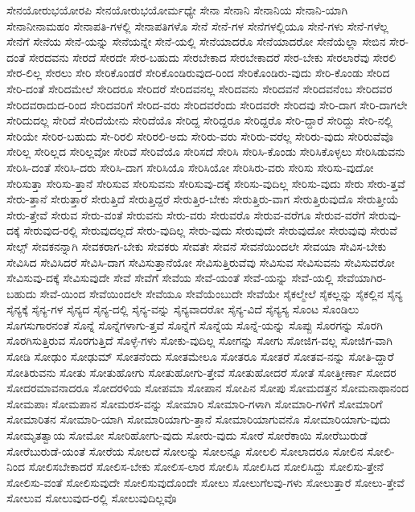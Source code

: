 {ಸೇನಯೋರುಭಯೋರಪಿ
ಸೇನಯೋರುಭಯೋರ್ಮಧ್ಯೇ
ಸೇನಾ
ಸೇನಾನಿ
ಸೇನಾನಿಯ
ಸೇನಾನಿ-ಯಾಗಿ
ಸೇನಾನೀನಾಮಹಂ
ಸೇನಾಪತಿ-ಗಳಲ್ಲಿ
ಸೇನಾಪತಿಗಳೊ
ಸೇನೆ
ಸೇನೆ-ಗಳ
ಸೇನೆಗಳಲ್ಲಿಯೂ
ಸೇನೆ-ಗಳು
ಸೇನೆ-ಗಳೆಲ್ಲ
ಸೇನೆಗೆ
ಸೇನೆಯ
ಸೇನೆ-ಯನ್ನು
ಸೇನೆಯನ್ನೇ
ಸೇನೆ-ಯಲ್ಲಿ
ಸೇನೆಯಾದರೊ
ಸೇನೆಯಾದರೋ
ಸೇನೆಯೆಲ್ಲಾ
ಸೇಬಿನ
ಸೇರ-ದಂತೆ
ಸೇರದವನು
ಸೇರದೆ
ಸೇರದೇ
ಸೇರ-ಬಹುದು
ಸೇರಬೇಕಾದ
ಸೇರಬೇಕಾದರೆ
ಸೇರ-ಬೇಕು
ಸೇರಲಾರೆವು
ಸೇರಲಿ
ಸೇರ-ಲಿಲ್ಲ
ಸೇರಲು
ಸೇರಿ
ಸೇರಿಕೊಂಡರೆ
ಸೇರಿಕೊಂಡಿರುವುದ-ರಿಂದ
ಸೇರಿಕೊಂಡಿರು-ವುದು
ಸೇರಿ-ಕೊಂಡು
ಸೇರಿದ
ಸೇರಿ-ದಂತೆ
ಸೇರಿದಮೇಲೆ
ಸೇರಿದರೂ
ಸೇರಿದರೆ
ಸೇರಿದವನಲ್ಲ
ಸೇರಿದವನು
ಸೇರಿದವನೆ
ಸೇರಿದವನೆಂಬ
ಸೇರಿದವರ
ಸೇರಿದವರಾದುದ-ರಿಂದ
ಸೇರಿದವರಿಗೆ
ಸೇರಿದ-ವರು
ಸೇರಿದವರೆಂದು
ಸೇರಿದವರೇ
ಸೇರಿದವು
ಸೇರಿ-ದಾಗ
ಸೇರಿ-ದಾಗಲೇ
ಸೇರಿದುದಲ್ಲ
ಸೇರಿದೆ
ಸೇರಿದೆಯೇನು
ಸೇರಿದೆಯೊ
ಸೇರಿದ್ದ
ಸೇರಿದ್ದರೂ
ಸೇರಿದ್ದರೊ
ಸೇರಿ-ದ್ದಾರೆ
ಸೇರಿದ್ದು
ಸೇರಿ-ನಲ್ಲಿ
ಸೇರಿಯೇ
ಸೇರಿರ-ಬಹುದು
ಸೇ-ರಿರಲಿ
ಸೇರಿರಲಿ-ಅದು
ಸೇರಿರು-ವರು
ಸೇರಿರು-ವರೆಲ್ಲ
ಸೇರಿರು-ವುದು
ಸೇರಿರುವೆವೊ
ಸೇರಿಲ್ಲ
ಸೇರಿಲ್ಲದ
ಸೇರಿಲ್ಲವೋ
ಸೇರಿವೆ
ಸೇರಿವೆಯೊ
ಸೇರಿಸದೆ
ಸೇರಿಸಿ
ಸೇರಿಸಿ-ಕೊಂಡು
ಸೇರಿಸಿಕೊಳ್ಳಲು
ಸೇರಿಸಿಡುವನು
ಸೇರಿಸಿ-ದಂತೆ
ಸೇರಿಸಿ-ದರು
ಸೇರಿಸಿ-ದಾಗ
ಸೇರಿಸಿಯೊ
ಸೇರಿಸಿಯೋ
ಸೇರಿಸಿರು-ವರು
ಸೇರಿಸು
ಸೇರಿಸು-ವುದೋ
ಸೇರಿಸುತ್ತಾ
ಸೇರಿಸು-ತ್ತಾನೆ
ಸೇರಿಸುವ
ಸೇರಿಸುವನು
ಸೇರಿಸುವು-ದಕ್ಕೆ
ಸೇರಿಸು-ವುದಿಲ್ಲ
ಸೇರಿಸು-ವುದು
ಸೇರು
ಸೇರು-ತ್ತವೆ
ಸೇರು-ತ್ತಾನೆ
ಸೇರುತ್ತಾರೆ
ಸೇರುತ್ತಿದೆ
ಸೇರುತ್ತಿದ್ದರೆ
ಸೇರುತ್ತಿರ-ಬೇಕು
ಸೇರುತ್ತಿರು-ವಾಗ
ಸೇರುತ್ತಿರುವುದೊ
ಸೇರುತ್ತೀಯೆ
ಸೇರು-ತ್ತೇವೆ
ಸೇರುವ
ಸೇರು-ವಂತೆ
ಸೇರುವನು
ಸೇರು-ವರು
ಸೇರುವರೊ
ಸೇರುವ-ವರೆಗೂ
ಸೇರುವ-ವರೆಗೆ
ಸೇರುವು-ದಕ್ಕೆ
ಸೇರುವುದ-ರಲ್ಲಿ
ಸೇರುವುದಲ್ಲದೆ
ಸೇರು-ವುದಿಲ್ಲ
ಸೇರು-ವುದು
ಸೇರುವುದೇ
ಸೇರುವುದೋ
ಸೇರುವುವು
ಸೇರುವೆ
ಸೇಲ್ಸ್
ಸೇವಕನನ್ನಾಗಿ
ಸೇವಕರಾಗ-ಬೇಕು
ಸೇವಕರು
ಸೇವತೇ
ಸೇವನೆ
ಸೇವನೆಯಿಂದಲೇ
ಸೇವಯಾ
ಸೇವಿಸ-ಬೇಕು
ಸೇವಿಸಿದ
ಸೇವಿಸಿದರೆ
ಸೇವಿಸಿ-ದಾಗ
ಸೇವಿಸುತ್ತಾನೆಯೋ
ಸೇವಿಸುತ್ತಿರುವೆವು
ಸೇವಿಸುವ
ಸೇವಿಸುವನು
ಸೇವಿಸುವರೋ
ಸೇವಿಸುವು-ದಕ್ಕೆ
ಸೇವಿಸುವುದೇ
ಸೇವೆ
ಸೇವೆಗೆ
ಸೇವೆಯ
ಸೇವೆ-ಯಂತೆ
ಸೇವೆ-ಯನ್ನು
ಸೇವೆ-ಯಲ್ಲಿ
ಸೇವೆಯಾಗಿರ-ಬಹುದು
ಸೇವೆ-ಯಿಂದ
ಸೇವೆಯಿಂದಲೇ
ಸೇವೆಯೂ
ಸೇವೆಯೆಂಬುದೇ
ಸೇವೆಯೇ
ಸೈಕಲ್ಮೇಲೆ
ಸೈಕಲ್ಲನ್ನು
ಸೈಕಲ್ಲಿನ
ಸೈನ್ಯ
ಸೈನ್ಯಕ್ಕೆ
ಸೈನ್ಯ-ಗಳ
ಸೈನ್ಯದ
ಸೈನ್ಯ-ದಲ್ಲಿ
ಸೈನ್ಯ-ವನ್ನು
ಸೈನ್ಯವಾದರೋ
ಸೈನ್ಯ-ವಿದೆ
ಸೈನ್ಯಸ್ಯ
ಸೊಂಟ
ಸೊಂಡಿಲು
ಸೊಗಸುಗಾರನಂತೆ
ಸೊನ್ನೆ
ಸೊನ್ನೆಗಳಾಗು-ತ್ತವೆ
ಸೊನ್ನೆಗೆ
ಸೊನ್ನೆಯ
ಸೊನ್ನೆ-ಯನ್ನು
ಸೊಪ್ಪು
ಸೊರಗನ್ನು
ಸೊರಗಿ
ಸೊರಗಿಸುತ್ತಿರುವ
ಸೊರಗುತ್ತಿದೆ
ಸೊಳ್ಳೆ-ಗಳು
ಸೋಕು-ವುದಿಲ್ಲ
ಸೋಗನ್ನು
ಸೋಗು
ಸೋಜಿಗ-ವಲ್ಲ
ಸೋಜಿಗ-ವಾಗಿ
ಸೋಡಿ
ಸೋಢುಂ
ಸೋಢುಮ್
ಸೋತನೆಂದು
ಸೋತಮೇಲೂ
ಸೋತರೂ
ಸೋತರೆ
ಸೋತವ-ನನ್ನು
ಸೋತಿ-ದ್ದಾರೆ
ಸೋತಿರುವನು
ಸೋತು
ಸೋತುಹೋಗು
ಸೋತುಹೋಗು-ತ್ತೇವೆ
ಸೋತುಹೋದರೆ
ಸೋತೆ
ಸೋತ್ತೀರ್ಣಾ
ಸೋದರ
ಸೋದರಮಾವನಾದರೂ
ಸೋದರಳಿಯ
ಸೋಪಮಾ
ಸೋಪಾನ
ಸೋಪಿನ
ಸೋಪು
ಸೋಮದತ್ತನ
ಸೋಮನಾಥಾನಂದ
ಸೋಮಪಾಃ
ಸೋಮಪಾನ
ಸೋಮರಸ-ವನ್ನು
ಸೋಮಾರಿ
ಸೋಮಾರಿ-ಗಳಾಗಿ
ಸೋಮಾರಿ-ಗಳಿಗೆ
ಸೋಮಾರಿಗೆ
ಸೋಮಾರಿತನ
ಸೋಮಾರಿ-ಯಾಗಿ
ಸೋಮಾರಿಯಾಗು-ತ್ತಾನೆ
ಸೋಮಾರಿಯಾಗುವನೊ
ಸೋಮಾರಿಯಾಗು-ವುದು
ಸೋಮೃತತ್ವಾಯ
ಸೋಮೋ
ಸೋರಿಹೋಗು-ವುದು
ಸೋರು-ವುದು
ಸೋರೆ
ಸೋರೆಕಾಯಿ
ಸೋರೆಬುರುಡೆ
ಸೋರೆಬುರುಡೆ-ಯಂತೆ
ಸೋರೆಯ
ಸೋಲದೆ
ಸೋಲನ್ನು
ಸೋಲನ್ನೂ
ಸೋಲಲಿ
ಸೋಲಾದರೂ
ಸೋಲಿನ
ಸೋಲಿ-ನಿಂದ
ಸೋಲಿಸಬೇಕಾದರೆ
ಸೋಲಿಸ-ಬೇಕು
ಸೋಲಿಸ-ಲಾರ
ಸೋಲಿಸಿ
ಸೋಲಿಸಿದ
ಸೋಲಿಸಿದ್ದು
ಸೋಲಿಸು-ತ್ತೇನೆ
ಸೋಲಿಸು-ವಂತೆ
ಸೋಲಿಸುವುದೇ
ಸೋಲಿಸುವುದೊಂದೇ
ಸೋಲು
ಸೋಲುಗೆಲವು-ಗಳು
ಸೋಲುತ್ತಾರೆ
ಸೋಲು-ತ್ತೇವೆ
ಸೋಲುವ
ಸೋಲುವುದ-ರಲ್ಲಿ
ಸೋಲುವುದಿಲ್ಲವೊ
}
